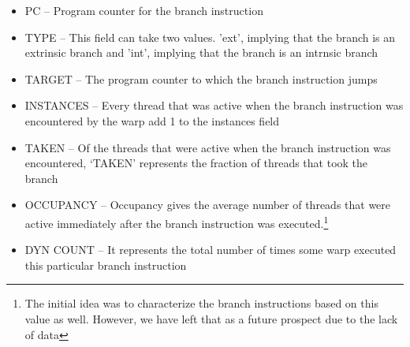 \begin{itemize}
	\item PC -- Program counter for the branch instruction
	\item TYPE -- This field can take two values. 'ext', implying that the branch is an extrinsic branch and 'int', implying that the branch is an intrnsic branch 
	\item TARGET -- The program counter to which the branch instruction jumps
	\item INSTANCES -- Every thread that was active when the branch instruction was encountered by the warp add 1 to the instances field
	\item TAKEN -- Of the threads that were active when the branch instruction was encountered, `TAKEN' represents the fraction of threads that took the branch
	\item OCCUPANCY -- Occupancy gives the average number of threads that were active immediately after the branch instruction was executed.\footnote{The initial idea was to characterize the branch instructions based on this value as well. However, we have left that as a future prospect due to the lack of data}
	\item DYN COUNT -- It represents the total number of times some warp executed this particular branch instruction
\end{itemize}
